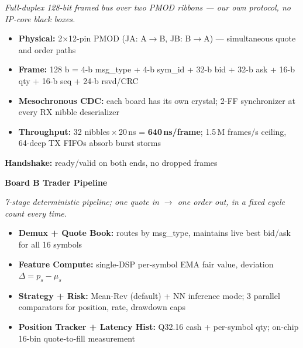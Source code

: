 \documentclass[final]{article}
\begin{document}
\begin{minipage}[t]{34.8in}
{\begin{minipage}[t]{10.6in}
\vspace{0.06in}
{\fontsize{20}{26}\selectfont\itshape\color{uwgray}%
 Full-duplex 128-bit framed bus over two PMOD ribbons --- our own
 protocol, no IP-core black boxes.}

\vspace{0.10in}
\begin{itemize}[leftmargin=0.30in, itemsep=0.06in, labelsep=0.10in]
  \item[\color{linkcolor}\textbullet]
    \textbf{Physical:} 2$\times$12-pin PMOD (JA: A$\to$B,\; JB: B$\to$A)
    --- simultaneous quote and order paths
  \item[\color{linkcolor}\textbullet]
    \textbf{Frame:} 128 b = 4-b msg\_type + 4-b sym\_id + 32-b bid +
    32-b ask + 16-b qty + 16-b seq + 24-b rsvd/CRC
  \item[\color{linkcolor}\textbullet]
    \textbf{Mesochronous CDC:} each board has its own crystal;
    2-FF synchronizer at every RX nibble deserializer
  \item[\color{linkcolor}\textbullet]
    \textbf{Throughput:} 32 nibbles\,$\times$\,20\,ns = \textbf{640\,ns/frame};
    1.5\,M frames/s ceiling, 64-deep TX FIFOs absorb burst storms
\end{itemize}

\vspace{0.10in}
{\fontsize{20}{26}\selectfont\color{uwdark}%
\textbf{Handshake:}\; ready/valid on both ends, no dropped frames}
\end{minipage}\hfill
\begin{minipage}[t]{10.6in}
{\fontsize{24}{30}\selectfont\bfseries\color{boardBcolor}%
 Board B \;\textemdash\; Trader Pipeline}

\vspace{0.06in}
{\fontsize{20}{26}\selectfont\itshape\color{uwgray}%
 7-stage deterministic pipeline; one quote in $\to$ one order out, in
 a fixed cycle count every time.}

\vspace{0.10in}
\begin{itemize}[leftmargin=0.30in, itemsep=0.06in, labelsep=0.10in]
  \item[\color{boardBcolor}\textbullet]
    \textbf{Demux + Quote Book:} routes by msg\_type, maintains live
    best bid/ask for all 16 symbols
  \item[\color{boardBcolor}\textbullet]
    \textbf{Feature Compute:} single-DSP per-symbol EMA fair value,
    deviation $\Delta = p_s - \mu_s$
  \item[\color{boardBcolor}\textbullet]
    \textbf{Strategy + Risk:} Mean-Rev (default) + NN inference mode;
    3 parallel comparators for position, rate, drawdown caps
  \item[\color{boardBcolor}\textbullet]
    \textbf{Position Tracker + Latency Hist:} Q32.16 cash + per-symbol
    qty; on-chip 16-bin quote-to-fill measurement
\end{itemize}


\end{minipage}}
\end{minipage}
\end{document}
